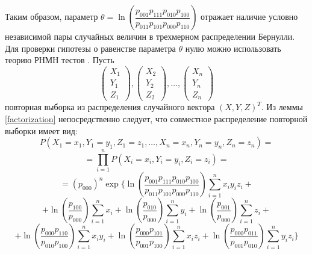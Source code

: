    Таким образом, параметр $\theta = \ln  \left(\dfrac{p_{001}p_{111}p_{010}p_{100}}{p_{011}p_{101}p_{000}p_{110}}\right)$ отражает наличие условно независимой пары
    случайных величин в трехмерном распределении Бернулли.
    Для проверки гипотезы о равенстве параметра $\theta$ нулю можно использовать 
    теорию РНМН тестов \cite{Lehmann1986}. Пусть
    $$
        \begin{pmatrix}
            X_1 \\
            Y_1 \\
            Z_1
        \end{pmatrix},
        \begin{pmatrix}
            X_2 \\
            Y_2 \\
            Z_2
        \end{pmatrix}, \ldots,
        \begin{pmatrix}
            X_n \\
            Y_n \\
            Z_n
        \end{pmatrix}
    $$ повторная выборка из распределения случайного вектора $(X,Y,Z)^T$.
    Из леммы \ref{factorization} непосредственно следует, что совместное распределение повторной выборки имеет вид:
    $$
    P(X_1=x_1,Y_1=y_1,Z_1=z_1,\ldots,X_n=x_n,Y_n=y_n,Z_n=z_n)=
    $$
    $$
    =\prod_{i=1}^n P(X_i=x_i,Y_i=y_i,Z_i=z_i) =
    $$
    $$
     =(p_{000})^n
            \exp \Biggl\{ \ln  \left(\dfrac{p_{001}p_{111}p_{010}p_{100}}{p_{011}p_{101}p_{000}p_{110}}\right) \sum_{i=1}^n x_i y_i z_i +$$
        $$ +
            \ln\left(\dfrac{p_{100}}{p_{000}}\right) \sum_{i=1}^{n} x_i + \ln\left(\dfrac{p_{010}}{p_{000}}\right) \sum_{i=1}^{n} y_i +
            \ln\left(\dfrac{p_{001}}{p_{000}}\right) \sum_{i=1}^{n} z_i +
        $$
        $$
            +\ln \left(\dfrac{p_{000}p_{110}}{p_{010}p_{100}}\right) \sum_{i=1}^n x_i y_i +
            \ln \left(\dfrac{p_{000}p_{101}}{p_{001}p_{100}}\right) \sum_{i=1}^n x_i z_i +
            \ln \left(\dfrac{p_{000}p_{011}}{p_{001}p_{010}}\right) \sum_{i=1}^n y_i z_i \Biggr\}
        $$
    
